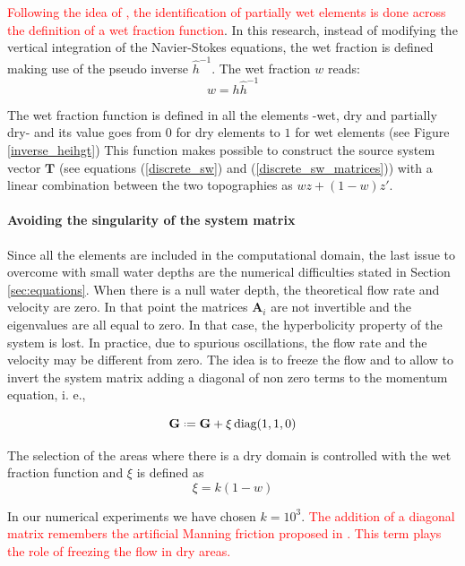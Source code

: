 \documentclass[a4paper,12pt]{elsarticle}
\newcommand{\Miguel}[1]{\textcolor{red}{#1}}
\newcommand{\defeq}{\mathrel{\vcenter{\baselineskip0.5ex\lineskiplimit0pt\hbox{\scriptsize.}\hbox{\scriptsize.}}}=}
\begin{document}
\Miguel{
Following the idea of \cite{defina2000}, the identification of partially wet elements is done across the definition of a wet fraction function}. In this research, instead of modifying the vertical integration of the Navier-Stokes equations, the wet fraction is  defined making use of the pseudo inverse $\hat{h}^{-1}$. The wet fraction $w$ reads:
\begin{equation}
w = h\hat{h}^{-1}
\end{equation}

The wet fraction function is defined in all the elements -wet, dry and partially dry- and its value goes from $0$ for dry elements to $1$ for wet elements (see Figure \ref{inverse_heihgt})
This function makes possible to construct the source system vector $\mathbf{T}$ (see equations (\ref{discrete_sw}) and (\ref{discrete_sw_matrices})) with a linear combination between the two topographies as $wz + (1-w)z'$.


\paragraph{Avoiding the singularity of the system matrix}
Since all the elements are included in the computational domain, the last issue to overcome with small water depths are the numerical difficulties stated in Section \ref{sec:equations}.
When there is a null water depth, the theoretical flow rate and velocity are zero. In that point the matrices $\mathbf{A}_i$ are not invertible and the eigenvalues are all equal to zero. In that case, the hyperbolicity property of the system is lost.
In practice, due to spurious oscillations, the flow rate and the velocity may be different from zero. The idea is to freeze the flow and to allow to invert the system matrix adding a diagonal of non zero terms to the momentum equation, i. e.,


\begin{equation}
\mathbf{G} \defeq \mathbf{G} + \xi\,\text{diag}(1, 1, 0)
\end{equation}


The selection of the areas where there is a dry domain is controlled with the wet fraction function and $\xi$ is defined as
\begin{equation}
\xi = k(1-w)
\end{equation}

In our numerical experiments we have chosen $k=10^3$.
\Miguel{
The addition of a diagonal matrix remembers the artificial Manning friction proposed in \cite{heniche2000}. This term plays the role of freezing the flow in dry areas.
}
\end{document}
